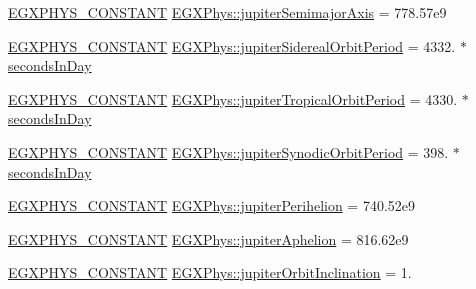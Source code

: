 \begin{DoxyCompactItemize}
\item 
\mbox{\hyperlink{group___e_g_x_phys-_constants-_macros_ga76980d288494ce1714c9ac68a95ba702}{E\+G\+X\+P\+H\+Y\+S\+\_\+\+C\+O\+N\+S\+T\+A\+NT}} \mbox{\hyperlink{group___e_g_x_phys-_constants-_astrophysics-_solar_system-_mercury-_orbit_ga7cfafd3fa5a3ac5018c0be84dbb6600c}{E\+G\+X\+Phys\+::jupiter\+Semimajor\+Axis}} = 778.\+57e9
\item 
\mbox{\hyperlink{group___e_g_x_phys-_constants-_macros_ga76980d288494ce1714c9ac68a95ba702}{E\+G\+X\+P\+H\+Y\+S\+\_\+\+C\+O\+N\+S\+T\+A\+NT}} \mbox{\hyperlink{group___e_g_x_phys-_constants-_astrophysics-_solar_system-_mercury-_orbit_ga96e12fb8636fcff0c503d7765bc1e192}{E\+G\+X\+Phys\+::jupiter\+Sidereal\+Orbit\+Period}} = 4332. $\ast$ \mbox{\hyperlink{namespace_e_g_x_phys_a93d2a00d75411b58cbf63ab3fd1f8bc2}{seconds\+In\+Day}}
\item 
\mbox{\hyperlink{group___e_g_x_phys-_constants-_macros_ga76980d288494ce1714c9ac68a95ba702}{E\+G\+X\+P\+H\+Y\+S\+\_\+\+C\+O\+N\+S\+T\+A\+NT}} \mbox{\hyperlink{group___e_g_x_phys-_constants-_astrophysics-_solar_system-_mercury-_orbit_gadfa22f4534517958f4a3d8b13b83eb6f}{E\+G\+X\+Phys\+::jupiter\+Tropical\+Orbit\+Period}} = 4330. $\ast$ \mbox{\hyperlink{namespace_e_g_x_phys_a93d2a00d75411b58cbf63ab3fd1f8bc2}{seconds\+In\+Day}}
\item 
\mbox{\hyperlink{group___e_g_x_phys-_constants-_macros_ga76980d288494ce1714c9ac68a95ba702}{E\+G\+X\+P\+H\+Y\+S\+\_\+\+C\+O\+N\+S\+T\+A\+NT}} \mbox{\hyperlink{group___e_g_x_phys-_constants-_astrophysics-_solar_system-_mercury-_orbit_gaa7c9f21fa2b8062166764a6f59d0bbeb}{E\+G\+X\+Phys\+::jupiter\+Synodic\+Orbit\+Period}} = 398. $\ast$ \mbox{\hyperlink{namespace_e_g_x_phys_a93d2a00d75411b58cbf63ab3fd1f8bc2}{seconds\+In\+Day}}
\item 
\mbox{\hyperlink{group___e_g_x_phys-_constants-_macros_ga76980d288494ce1714c9ac68a95ba702}{E\+G\+X\+P\+H\+Y\+S\+\_\+\+C\+O\+N\+S\+T\+A\+NT}} \mbox{\hyperlink{group___e_g_x_phys-_constants-_astrophysics-_solar_system-_mercury-_orbit_ga7eb6c0d478ae5c7ad6ae94bfcb9c47d9}{E\+G\+X\+Phys\+::jupiter\+Perihelion}} = 740.\+52e9
\item 
\mbox{\hyperlink{group___e_g_x_phys-_constants-_macros_ga76980d288494ce1714c9ac68a95ba702}{E\+G\+X\+P\+H\+Y\+S\+\_\+\+C\+O\+N\+S\+T\+A\+NT}} \mbox{\hyperlink{group___e_g_x_phys-_constants-_astrophysics-_solar_system-_mercury-_orbit_ga8257f4e64891502c2027114ba8003fb6}{E\+G\+X\+Phys\+::jupiter\+Aphelion}} = 816.\+62e9
\item 
\mbox{\hyperlink{group___e_g_x_phys-_constants-_macros_ga76980d288494ce1714c9ac68a95ba702}{E\+G\+X\+P\+H\+Y\+S\+\_\+\+C\+O\+N\+S\+T\+A\+NT}} \mbox{\hyperlink{group___e_g_x_phys-_constants-_astrophysics-_solar_system-_mercury-_orbit_ga547b86c72473737c6c41220973a5450b}{E\+G\+X\+Phys\+::jupiter\+Orbit\+Inclination}} = 1.

\end{DoxyCompactItemize}
